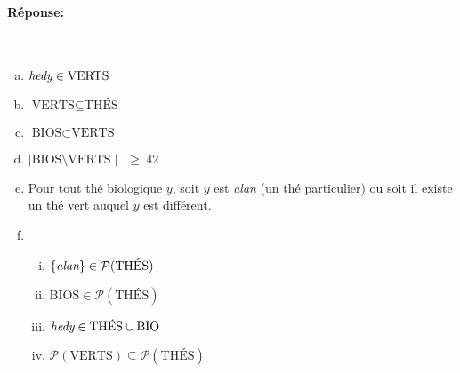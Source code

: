 \documentclass[12pt]{article}
\newcommand{\union}{\cup}                 %
\begin{document}
\paragraph{Réponse:}~\\


\begin{enumerate}[a)]
 \item $\emph{hedy} \in \mbox{VERTS}$\\
 \item $\mbox{VERTS} \subseteq \mbox{THÉS}$\\
 \item $\mbox{BIOS} \subset \mbox{VERTS}$\\
 \item $\mid \mbox{BIOS} \setminus \mbox{VERTS} \mid ~~\geq~ 42$\\
 \item Pour tout thé biologique $y$, soit $y$ est \emph{alan} (un thé particulier) ou soit il existe un thé vert auquel $y$ est différent.\\
 \item \begin{enumerate}[i)]
    \item $\{\emph{alan}\} \in \mathcal{P}(\mbox{THÉS})$\\
    \item $\mbox{BIOS} \in \mathcal{P}(\mbox{THÉS})$\\
    \item $\emph{hedy} \in \mbox{THÉS} \union \mbox{BIO}$\\
    \item $\mathcal{P}(\mbox{VERTS}) \subseteq \mathcal{P}(\mbox{THÉS})$
\end{enumerate}
\end{enumerate}




\end{document}
